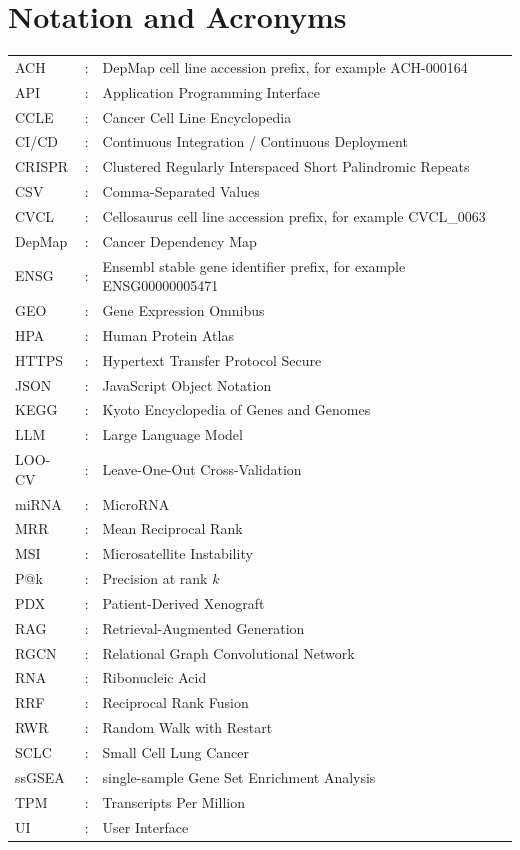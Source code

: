 \documentclass[author={Karen Coutinho, Ishaan Bhalla, Aman Raj, Dixit Kaloorani Malarmannan},
                supervisor={Dr. Daniel D'Andrea},
                degree={MSc},
                title={CellSelector Omics: A Multi-Omics Recommendation System for Cell Line Selection},
                subtitle={},
                type={},
                year={2026}]{dissertation}
\begin{document}
\chapter*{Notation and Acronyms}

{\footnotesize
\renewcommand{\arraystretch}{1.1}
\setlength{\tabcolsep}{6pt}

\begin{tabular}{@{}p{2.3cm}cp{11.5cm}@{}}
ACH      & : & DepMap cell line accession prefix, for example ACH-000164 \\
API      & : & Application Programming Interface \\
CCLE     & : & Cancer Cell Line Encyclopedia \\
CI/CD    & : & Continuous Integration / Continuous Deployment \\
CRISPR   & : & Clustered Regularly Interspaced Short Palindromic Repeats \\
CSV      & : & Comma-Separated Values \\
CVCL     & : & Cellosaurus cell line accession prefix, for example CVCL\_0063 \\
DepMap   & : & Cancer Dependency Map \\
ENSG     & : & Ensembl stable gene identifier prefix, for example ENSG00000005471 \\
GEO      & : & Gene Expression Omnibus \\
HPA      & : & Human Protein Atlas \\
HTTPS    & : & Hypertext Transfer Protocol Secure \\
JSON     & : & JavaScript Object Notation \\
KEGG     & : & Kyoto Encyclopedia of Genes and Genomes \\
LLM      & : & Large Language Model \\
LOO-CV   & : & Leave-One-Out Cross-Validation \\
miRNA    & : & MicroRNA \\
MRR      & : & Mean Reciprocal Rank \\
MSI      & : & Microsatellite Instability \\
P@k      & : & Precision at rank $k$ \\
PDX      & : & Patient-Derived Xenograft \\
RAG      & : & Retrieval-Augmented Generation \\
RGCN     & : & Relational Graph Convolutional Network \\
RNA      & : & Ribonucleic Acid \\
RRF      & : & Reciprocal Rank Fusion \\
RWR      & : & Random Walk with Restart \\
SCLC     & : & Small Cell Lung Cancer \\
ssGSEA   & : & single-sample Gene Set Enrichment Analysis \\
TPM      & : & Transcripts Per Million \\
UI       & : & User Interface \\
\end{tabular}

}
\end{document}
